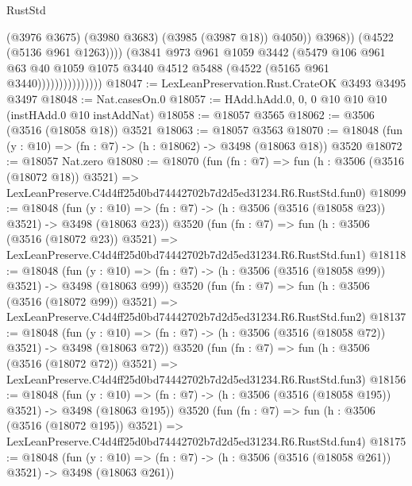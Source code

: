 \begin{lexlean}{RustStd}
\begin{coremodule}
                                      (@3976 @3675)
                                      (@3980 @3683)
                                      (@3985 (@3987 @18))
                                      @4050))
                                  @3968))
                              (@4522 (@5136 @961 @1263))))
                          (@3841
                            @973
                            @961
                            @1059
                            @3442
                            (@5479
                              @106
                              @961
                              @63
                              @40
                              @1059
                              @1075
                              @3440
                              @4512
                              @5488
                              (@4522 (@5165 @961 @3440)))))))))))))))
@18047 := LexLeanPreservation.Rust.CrateOK @3493 @3495 @3497
@18048 := Nat.casesOn.{0}
@18057 := HAdd.hAdd.{0, 0, 0} @10 @10 @10 (instHAdd.{0} @10 instAddNat)
@18058 := @18057 @3565
@18062 := @3506 (@3516 (@18058 @18)) @3521
@18063 := @18057 @3563
@18070 := @18048 (fun (y : @10) => (fn : @7) -> (h : @18062) -> @3498 (@18063 @18)) @3520
@18072 := @18057 Nat.zero
@18080 := @18070
    (fun (fn : @7) =>
    fun (h : @3506 (@3516 (@18072 @18)) @3521) =>
    LexLeanPreserve.C4d4ff25d0bd74442702b7d2d5ed31234.R6.RustStd.fun0)
@18099 := @18048
    (fun (y : @10) => (fn : @7) -> (h : @3506 (@3516 (@18058 @23)) @3521) -> @3498 (@18063 @23))
    @3520
    (fun (fn : @7) =>
    fun (h : @3506 (@3516 (@18072 @23)) @3521) =>
    LexLeanPreserve.C4d4ff25d0bd74442702b7d2d5ed31234.R6.RustStd.fun1)
@18118 := @18048
    (fun (y : @10) => (fn : @7) -> (h : @3506 (@3516 (@18058 @99)) @3521) -> @3498 (@18063 @99))
    @3520
    (fun (fn : @7) =>
    fun (h : @3506 (@3516 (@18072 @99)) @3521) =>
    LexLeanPreserve.C4d4ff25d0bd74442702b7d2d5ed31234.R6.RustStd.fun2)
@18137 := @18048
    (fun (y : @10) => (fn : @7) -> (h : @3506 (@3516 (@18058 @72)) @3521) -> @3498 (@18063 @72))
    @3520
    (fun (fn : @7) =>
    fun (h : @3506 (@3516 (@18072 @72)) @3521) =>
    LexLeanPreserve.C4d4ff25d0bd74442702b7d2d5ed31234.R6.RustStd.fun3)
@18156 := @18048
    (fun (y : @10) => (fn : @7) -> (h : @3506 (@3516 (@18058 @195)) @3521) -> @3498 (@18063 @195))
    @3520
    (fun (fn : @7) =>
    fun (h : @3506 (@3516 (@18072 @195)) @3521) =>
    LexLeanPreserve.C4d4ff25d0bd74442702b7d2d5ed31234.R6.RustStd.fun4)
@18175 := @18048
    (fun (y : @10) => (fn : @7) -> (h : @3506 (@3516 (@18058 @261)) @3521) -> @3498 (@18063 @261))

\end{coremodule}
\end{lexlean}
